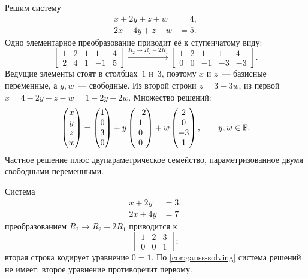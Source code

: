 \begin{example}
\label{ex:gauss-parametric}
Решим систему
\[
  \begin{aligned}
    x + 2y + z + w &= 4, \\
    2x + 4y + z - w &= 5.
  \end{aligned}
\]
Одно элементарное преобразование приводит её к ступенчатому виду:
\[
  \left[\begin{array}{rrrr|r}
    1 & 2 &  1 &  1 & 4 \\
    2 & 4 &  1 & -1 & 5
  \end{array}\right]
  \xrightarrow{R_2 \to R_2 - 2R_1}
  \left[\begin{array}{rrrr|r}
    1 & 2 &  1 &  1 & 4 \\
    0 & 0 & -1 & -3 & -3
  \end{array}\right].
\]
Ведущие элементы стоят в столбцах~$1$ и~$3$, поэтому $x$ и $z$~---
базисные переменные, а $y, w$~--- свободные. Из второй строки
$z = 3 - 3w$, из первой $x = 4 - 2y - z - w = 1 - 2y + 2w$. Множество
решений:
\[
  \begin{pmatrix} x \\ y \\ z \\ w \end{pmatrix}
  =
  \begin{pmatrix} 1 \\ 0 \\ 3 \\ 0 \end{pmatrix}
  + y \begin{pmatrix} -2 \\ 1 \\ 0 \\ 0 \end{pmatrix}
  + w \begin{pmatrix} 2 \\ 0 \\ -3 \\ 1 \end{pmatrix},
  \qquad y, w \in \mathbb{F}.
\]
Частное решение плюс двупараметрическое семейство, параметризованное
двумя свободными переменными.
\end{example}

\begin{example}
\label{ex:gauss-inconsistent}
Система
\[
  \begin{aligned}
    x + 2y &= 3, \\
    2x + 4y &= 7
  \end{aligned}
\]
преобразованием $R_2 \to R_2 - 2R_1$ приводится к
\[
  \left[\begin{array}{rr|r}
    1 & 2 & 3 \\
    0 & 0 & 1
  \end{array}\right];
\]
вторая строка кодирует уравнение $0 = 1$. По \cref{cor:gauss-solving}
система решений не имеет: второе уравнение противоречит первому.
\end{example}


